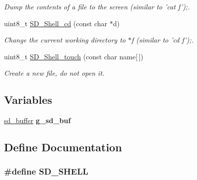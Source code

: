 \begin{DoxyCompactItemize}
\begin{DoxyCompactList}\small\item\em \-Dump the contents of a file to the screen (similar to 'cat f');. \end{DoxyCompactList}\item 
uint8\-\_\-t \hyperlink{group__sd__public_gadf4f410c8c353e6a84f77e1df1b9e424}{\-S\-D\-\_\-\-Shell\-\_\-cd} (const char $\ast$d)
\begin{DoxyCompactList}\small\item\em \-Change the current working directory to $\ast$f (similar to 'cd f');. \end{DoxyCompactList}\item 
uint8\-\_\-t \hyperlink{group__sd__public_gad2b78b0a9efcd14f43c2ab9e38d80e7f}{\-S\-D\-\_\-\-Shell\-\_\-touch} (const char name\mbox{[}$\,$\mbox{]})
\begin{DoxyCompactList}\small\item\em \-Create a new file, do not open it. \end{DoxyCompactList}\end{DoxyCompactItemize}
\subsection*{\-Variables}
\begin{DoxyCompactItemize}
\item 
\hypertarget{group__sd__public_ga0bd95548a4187da52f3cda8634fefded}{\hyperlink{struct__sd__buffer}{sd\-\_\-buffer} {\bfseries g\-\_\-sd\-\_\-buf}}\label{group__sd__public_ga0bd95548a4187da52f3cda8634fefded}

\end{DoxyCompactItemize}


\subsection{\-Define \-Documentation}
\hypertarget{group__sd__public_ga453e7feb2ddf9256c6b5ab9399b12abc}{
\subsubsection[{\-S\-D\-\_\-\-S\-H\-E\-L\-L}]{\setlength{\rightskip}{0pt plus 5cm}\#define {\bf \-S\-D\-\_\-\-S\-H\-E\-L\-L}}}\label{group__sd__public_ga453e7feb2ddf9256c6b5ab9399b12abc}


